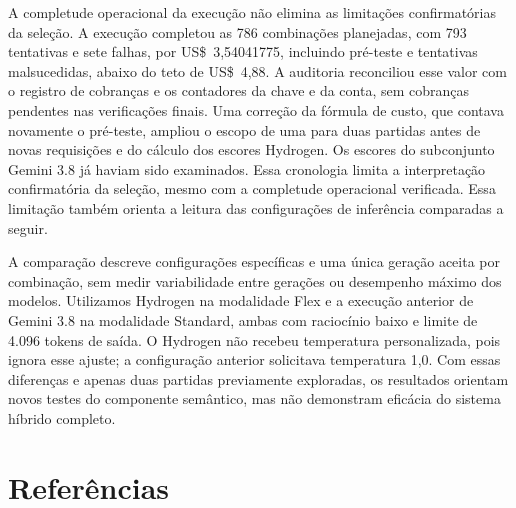 \documentclass[a4paper,10pt, twocolumn]{article}
\begin{document}
A completude operacional da execução não elimina as limitações confirmatórias da seleção. A execução completou as 786 combinações planejadas, com 793 tentativas e sete falhas, por US\$~3,54041775, incluindo pré-teste e tentativas malsucedidas, abaixo do teto de US\$~4,88. A auditoria reconciliou esse valor com o registro de cobranças e os contadores da chave e da conta, sem cobranças pendentes nas verificações finais. Uma correção da fórmula de custo, que contava novamente o pré-teste, ampliou o escopo de uma para duas partidas antes de novas requisições e do cálculo dos escores Hydrogen. Os escores do subconjunto Gemini 3.8 já haviam sido examinados. Essa cronologia limita a interpretação confirmatória da seleção, mesmo com a completude operacional verificada. Essa limitação também orienta a leitura das configurações de inferência comparadas a seguir.

A comparação descreve configurações específicas e uma única geração aceita por combinação, sem medir variabilidade entre gerações ou desempenho máximo dos modelos. Utilizamos Hydrogen na modalidade Flex e a execução anterior de Gemini 3.8 na modalidade Standard, ambas com raciocínio baixo e limite de 4.096 tokens de saída. O Hydrogen não recebeu temperatura personalizada, pois ignora esse ajuste; a configuração anterior solicitava temperatura 1,0. Com essas diferenças e apenas duas partidas previamente exploradas, os resultados orientam novos testes do componente semântico, mas não demonstram eficácia do sistema híbrido completo.

\FloatBarrier
\section{Referências}
\printbibliography[heading=none]
\end{document}
